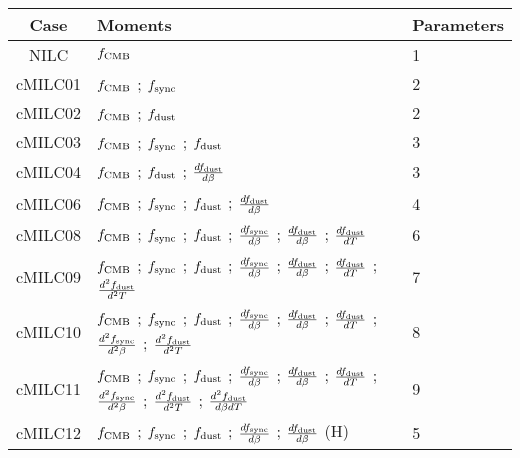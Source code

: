 \begin{tabular}{cll}
\toprule
    Case &                                                                                                                                                                                                                                                                  Moments &  Parameters \\
\midrule
 NILC &  $f_{\rm CMB}$ &  1 \\
 cMILC01 &  $f_{\rm CMB}$ ; $f_{\rm sync}$ &  2 \\
 cMILC02 &  $f_{\rm CMB}$ ; $f_{\rm dust}$ &  2 \\
 cMILC03 &  $f_{\rm CMB}$ ; $f_{\rm sync}$ ; $f_{\rm dust}$ &  3 \\
 cMILC04 &  $f_{\rm CMB}$ ; $f_{\rm dust}$ ; $\frac{d f_{\rm dust}}{d \beta}$ &  3 \\
 cMILC06 &  $f_{\rm CMB}$ ; $f_{\rm sync}$ ; $f_{\rm dust}$ ; $\frac{d f_{\rm dust}}{d \beta}$ &  4 \\
 cMILC08 &  $f_{\rm CMB}$ ; $f_{\rm sync}$ ; $f_{\rm dust}$ ; $\frac{d f_{\rm sync}}{d \beta}$ ; $\frac{d f_{\rm dust}}{d \beta}$ ; $\frac{d f_{\rm dust}}{d T}$ &  6 \\
 cMILC09 &  $f_{\rm CMB}$ ; $f_{\rm sync}$ ; $f_{\rm dust}$ ; $\frac{d f_{\rm sync}}{d \beta}$ ; $\frac{d f_{\rm dust}}{d \beta}$ ; $\frac{d f_{\rm dust}}{d T}$ ; $\frac{d^2 f_{\rm dust}}{d^2 T}$ &  7 \\
 cMILC10 &  $f_{\rm CMB}$ ; $f_{\rm sync}$ ; $f_{\rm dust}$ ; $\frac{d f_{\rm sync}}{d \beta}$ ; $\frac{d f_{\rm dust}}{d \beta}$ ; $\frac{d f_{\rm dust}}{d T}$ ; $\frac{d^2 f_{\rm sync}}{d^2 \beta}$ ; $\frac{d^2 f_{\rm dust}}{d^2 T}$ &  8 \\
 cMILC11 &  $f_{\rm CMB}$ ; $f_{\rm sync}$ ; $f_{\rm dust}$ ; $\frac{d f_{\rm sync}}{d \beta}$ ; $\frac{d f_{\rm dust}}{d \beta}$ ; $\frac{d f_{\rm dust}}{d T}$ ; $\frac{d^2 f_{\rm sync}}{d^2 \beta}$ ; $\frac{d^2 f_{\rm dust}}{d^2 T}$ ; $\frac{d^2 f_{\rm dust}}{d \beta d T}$ &  9 \\
 cMILC12 &  $f_{\rm CMB}$ ; $f_{\rm sync}$ ; $f_{\rm dust}$ ; $\frac{d f_{\rm sync}}{d \beta}$ ; $\frac{d f_{\rm dust}}{d \beta}$ (H) &  5 \\
\bottomrule
\end{tabular}
